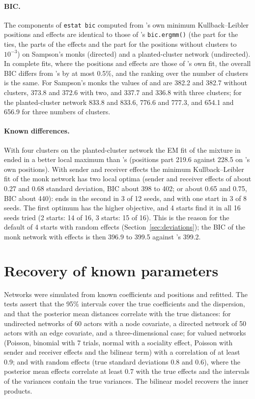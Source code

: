 \paragraph{BIC.} The components of \texttt{estat bic} computed from \latentnet{}'s own minimum Kullback--Leibler positions and effects are identical to those of \latentnet{}'s \texttt{bic.ergmm()} (the part for the ties, the parts of the effects and the part for the positions without clusters to $10^{-3}$) on Sampson's monks (directed) and a planted-cluster network (undirected). In complete fits, where the positions and effects are those of \nwlsm{}'s own fit, the overall BIC differs from \latentnet{}'s by at most 0.5\%, and the ranking over the number of clusters is the same. For Sampson's monks the values of \nwlsm{} and \latentnet{} are 382.2 and 382.7 without clusters, 373.8 and 372.6 with two, and 337.7 and 336.8 with three clusters; for the planted-cluster network 833.8 and 833.6, 776.6 and 777.3, and 654.1 and 656.9 for three numbers of clusters.

\paragraph{Known differences.} With four clusters on the planted-cluster network the EM fit of the mixture in \nwlsm{} ended in a better local maximum than \latentnet{}'s (positions part 219.6 against 228.5 on \latentnet{}'s own positions). With sender and receiver effects the minimum Kullback--Leibler fit of the monk network has two local optima (sender and receiver effects of about 0.27 and 0.68 standard deviation, BIC about 398 to 402; or about 0.65 and 0.75, BIC about 440): \latentnet{} ends in the second in 3 of 12 seeds, and \nwlsm{} with one start in 3 of 8 seeds. The first optimum has the higher objective, and 4 starts find it in all 16 seeds tried (2 starts: 14 of 16, 3 starts: 15 of 16). This is the reason for the default of 4 starts with random effects (Section~\ref{sec:deviations}); the BIC of the monk network with effects is then 396.9 to 399.5 against \latentnet{}'s 399.2.

\section{Recovery of known parameters}

Networks were simulated from known coefficients and positions and refitted. The tests assert that the 95\% intervals cover the true coefficients and the dispersion, and that the posterior mean distances correlate with the true distances: for undirected networks of 60 actors with a node covariate, a directed network of 50 actors with an edge covariate, and a three-dimensional case; for valued networks (Poisson, binomial with 7 trials, normal with a sociality effect, Poisson with sender and receiver effects and the bilinear term) with a correlation of at least 0.9; and with random effects (true standard deviations 0.8 and 0.6), where the posterior mean effects correlate at least 0.7 with the true effects and the intervals of the variances contain the true variances. The bilinear model recovers the inner products.

